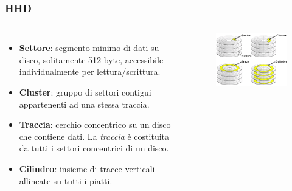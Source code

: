 \begin{frame}
	\frametitle{HHD}
	 

	\begin{columns}			
		\begin{itemize}
			
			\item \textbf{Settore}: segmento minimo di dati su disco, solitamente 512 byte, accessibile individualmente per lettura/scrittura. 
			\item \textbf{Cluster}: gruppo di settori contigui appartenenti ad una stessa traccia.
			\item \textbf{Traccia}: cerchio concentrico su un disco che contiene dati. La \textit{traccia} è costituita da tutti i settori concentrici di un disco.
			\item \textbf{Cilindro}: insieme di tracce verticali allineate su tutti i piatti.
		\end{itemize}

		\begin{figure}[!htbp]
			\centering
			\includegraphics[width=1.0\linewidth]{images/5_memory/hhd_info_3.png}
		\end{figure}
	\end{columns}
	
\end{frame}





